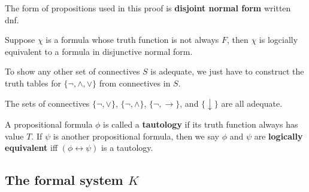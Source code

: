 \documentclass{article}
\begin{document}
The form of propositions used in this proof is \textbf{disjoint normal form} written dnf.

\begin{corollary}
    Suppose $\chi$ is a formula whose truth function is not always $F$, then $\chi$ is logcially equivalent to a formula in disjunctive normal form.
\end{corollary}

\begin{corollary}
    To show any other set of connectives $S$ is adequate, we just have to construct the truth tables for $\{\neg,\wedge,\vee\}$ from connectives in $S$.
\end{corollary}

\begin{corollary}
    The sets of connectives $\{\neg,\vee\}$, $\{\neg,\wedge\}$, $\{\neg, \rightarrow\}$, and $\{\downarrow\}$ are all adequate.
\end{corollary}

\begin{definition}
    A propositional formula $\phi$ is called a \textbf{tautology} if its truth function always has value $T$. If $\psi$ is another propositional formula, then we say $\phi$ and $\psi$ are \textbf{logically equivalent} iff $(\phi\leftrightarrow\psi)$ is a tautology.
\end{definition}

\subsection{The formal system $K$}
\end{document}

